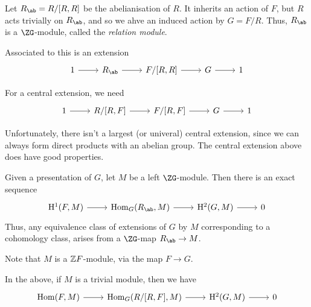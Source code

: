 \documentclass{article}
\begin{document}
Let \(R_\ab = R/[R, R]\) be the abelianisation of \(R\). It inherits an action of \(F\), but \(R\) acts trivially on \(R_\ab\), and so we ahve an induced action by \(G = F/R\). Thus, \(R_\ab\) is a \(\ZG\)-module, called the \emph{relation module}.

Associated to this is an extension
\[\begin{tikzcd}
	1 & {R_\ab} & {F/[R, R]} & G & 1
	\arrow[from=1-3, to=1-4]
	\arrow[from=1-4, to=1-5]
	\arrow[from=1-1, to=1-2]
	\arrow[from=1-2, to=1-3]
\end{tikzcd}\]

For a central extension, we need
\[\begin{tikzcd}
	1 & {R/[R, F]} & {F/[R, F]} & G & 1
	\arrow[from=1-1, to=1-2]
	\arrow[from=1-2, to=1-3]
	\arrow[from=1-3, to=1-4]
	\arrow[from=1-4, to=1-5]
\end{tikzcd}\]

Unfortunately, there isn't a largest (or univeral) central extension, since we can always form direct products with an abelian group. The central extension above does have good properties.

\begin{theorem}
    [MacLane]
    \label{thm:maclane}
    Given a presentation of \(G\), let \(M\) be a left \(\ZG\)-module. Then there is an exact sequence
    \[\begin{tikzcd}
        {\HH^1(F, M)} & {\Hom_G(R_\ab, M)} & {\HH^2(G, M)} & 0
        \arrow[from=1-1, to=1-2]
        \arrow[from=1-2, to=1-3]
        \arrow[from=1-3, to=1-4]
    \end{tikzcd}\]
    Thus, any equivalence class of extensions of \(G\) by \(M\) corresponding to a cohomology class, arises from a \(\ZG\)-map \(R_\ab \to M\).
\end{theorem}

Note that \(M\) is a \(\mathbb{Z} F\)-module, via the map \(F \to G\).

\begin{corollary}
    In the above, if \(M\) is a trivial module, then we have
\[\begin{tikzcd}
	{\Hom(F, M)} & {\Hom_G(R/[R, F], M)} & {\HH^2(G, M)} & 0
	\arrow[from=1-1, to=1-2]
	\arrow[from=1-2, to=1-3]
	\arrow[from=1-3, to=1-4]
\end{tikzcd}\]
\end{corollary}
\end{document}

